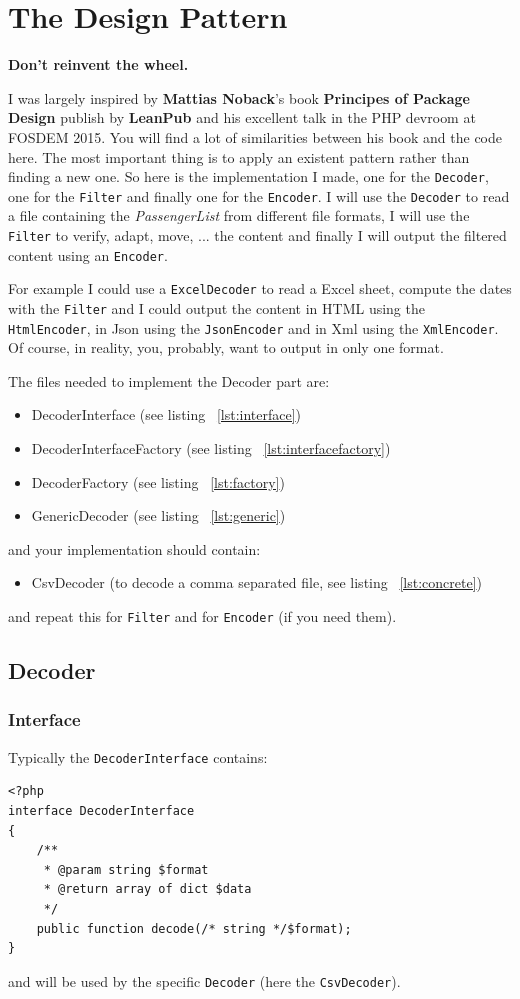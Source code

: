 \documentclass[a4paper, 11pt]{article}
\newcommand{\head}[1]{\textnormal{\textbf{#1}}}
\begin{document}
\section{The Design Pattern}
\head{Don't reinvent the wheel.}

I was largely inspired by \textbf{Mattias Noback}'s book \textbf{Principes of Package Design} publish by \textbf{LeanPub} and his excellent talk in the PHP devroom at FOSDEM 2015. You will find a lot of similarities between his book and the code here. The most important thing is to apply an existent pattern rather than finding a new one. So here is the implementation I made, one for the \texttt{Decoder}, one for the \texttt{Filter} and finally one for the \texttt{Encoder}. I will use the \texttt{Decoder} to read a file containing the \textit{PassengerList} from different file formats, I will use the \texttt{Filter} to verify, adapt, move, ... the content and finally I will output the filtered content using an \texttt{Encoder}.

For example I could use a \texttt{ExcelDecoder} to read a Excel sheet, compute the dates with the \texttt{Filter} and I could output the content in HTML using the \texttt{HtmlEncoder}, in Json using the \texttt{JsonEncoder} and in Xml using the \texttt{XmlEncoder}. Of course, in reality, you, probably, want to output in only one format.

The files needed to implement the Decoder part are:
\begin{itemize}
\item DecoderInterface (see listing ~\ref{lst:interface})
\item DecoderInterfaceFactory (see listing ~\ref{lst:interfacefactory})
\item DecoderFactory (see listing ~\ref{lst:factory})
\item GenericDecoder (see listing ~\ref{lst:generic})
\end{itemize}
and your implementation should contain:
\begin{itemize}
\item CsvDecoder (to decode a comma separated file, see listing ~\ref{lst:concrete})
\end{itemize}
and repeat this for \texttt{Filter} and for \texttt{Encoder} (if you need them).
\subsection{Decoder}
\subsubsection{Interface}
Typically the \texttt{DecoderInterface} contains:
 \label{lst:interface}
\begin{lstlisting}
<?php
interface DecoderInterface
{
	/**
	 * @param string $format
	 * @return array of dict $data
	 */
	public function decode(/* string */$format);
}
\end{lstlisting}
and will be used by the specific \texttt{Decoder} (here the \texttt{CsvDecoder}).
 
\end{document}
